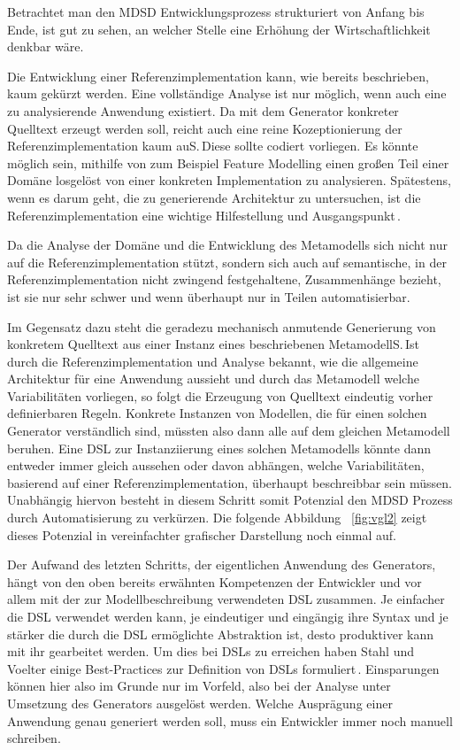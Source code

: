 \documentclass[12pt,oneside,a4paper,parskip]{scrbook}
\begin{document}
Betrachtet man den MDSD Entwicklungsprozess strukturiert von Anfang bis Ende, ist gut zu sehen, an welcher Stelle eine Erhöhung der Wirtschaftlichkeit denkbar wäre.

Die Entwicklung einer Referenzimplementation kann, wie bereits beschrieben, kaum gekürzt werden. Eine vollständige Analyse ist nur möglich, wenn auch eine zu analysierende Anwendung existiert. Da mit dem Generator konkreter Quelltext erzeugt werden soll, reicht auch eine reine Kozeptionierung der Referenzimplementation kaum auS.\,Diese sollte codiert vorliegen. Es könnte möglich sein, mithilfe von zum Beispiel Feature Modelling einen großen Teil einer Domäne losgelöst von einer konkreten Implementation zu analysieren. Spätestens, wenn es darum geht, die zu generierende Architektur zu untersuchen, ist die Referenzimplementation eine wichtige Hilfestellung und Ausgangspunkt\,\cite[S.\,123f.]{stahl2007}.

Da die Analyse der Domäne und die Entwicklung des Metamodells sich nicht nur auf die Referenzimplementation stützt, sondern sich auch auf semantische, in der Referenzimplementation nicht zwingend festgehaltene, Zusammenhänge bezieht, ist sie nur sehr schwer und wenn überhaupt nur in Teilen automatisierbar.

Im Gegensatz dazu steht die geradezu mechanisch anmutende Generierung von konkretem Quelltext aus einer Instanz eines beschriebenen MetamodellS.\,Ist durch die Referenzimplementation und Analyse bekannt, wie die allgemeine Architektur für eine Anwendung aussieht und durch das Metamodell welche Variabilitäten vorliegen, so folgt die Erzeugung von Quelltext eindeutig vorher definierbaren Regeln. Konkrete Instanzen von Modellen, die für einen solchen Generator verständlich sind, müssten also dann alle auf dem gleichen Metamodell beruhen. Eine DSL zur Instanziierung eines solchen Metamodells könnte dann entweder immer gleich aussehen oder davon abhängen, welche Variabilitäten, basierend auf einer Referenzimplementation, überhaupt beschreibbar sein müssen. Unabhängig hiervon besteht in diesem Schritt somit Potenzial den MDSD Prozess durch Automatisierung zu verkürzen. Die folgende Abbildung ~\ref{fig:vgl2} zeigt dieses Potenzial in vereinfachter grafischer Darstellung noch einmal auf.

Der Aufwand des letzten Schritts, der eigentlichen Anwendung des Generators, hängt von den oben bereits erwähnten Kompetenzen der Entwickler und vor allem mit der zur Modellbeschreibung verwendeten DSL zusammen. Je einfacher die DSL verwendet werden kann, je eindeutiger und eingängig ihre Syntax und je stärker die durch die DSL ermöglichte Abstraktion ist, desto produktiver kann mit ihr gearbeitet werden. Um dies bei DSLs zu erreichen haben Stahl und Voelter einige Best-Practices zur Definition von DSLs formuliert\,\cite[S.\,113]{stahl2007}. Einsparungen können hier also im Grunde nur im Vorfeld, also bei der Analyse unter Umsetzung des Generators ausgelöst werden. Welche Ausprägung einer Anwendung genau generiert werden soll, muss ein Entwickler immer noch manuell schreiben.
\end{document}
